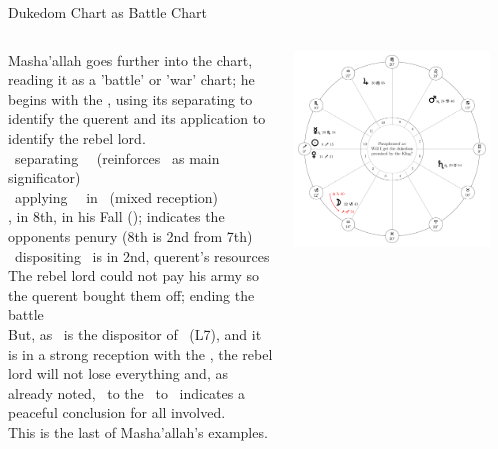 \begin{frame}[t]{Dukedom Chart as Battle Chart}
\footnotesize
\begin{columns}[T, onlytextwidth]
Masha'allah goes further into the chart, reading it as a 'battle' or 'war' chart; he begins with the \Moon, using its separating to identify the querent and its application to identify the rebel lord. \\
\vspace{0.25cm}
\Moon\ separating \Trine\ \Jupiter\ (reinforces \Jupiter\ as main significator) \\
\Moon\ applying \Opposition\ \Mars\ in \Cancer\ (mixed reception) \\
\vspace{0.2cm}
\Mars\Retrograde, in 8th, in his Fall (\Cancer); indicates the opponents penury (8th is 2nd from 7th) \\
\vspace{0.2cm}
\Moon\ dispositing \Mars\ is in 2nd, querent's resources \\
The rebel lord could not pay his army so the querent bought them off; ending the battle \\
\vspace{0.25cm}
But, as \Mars\ is the dispositor of \Mercury\ (L7), and it is in a strong reception with the \Moon, the rebel lord will not lose everything and, as already noted, \Mercury\ to the \Sextile\ to \Jupiter\ indicates a peaceful conclusion for all involved.\\
\vspace{0.2cm}
This is the last of Masha'allah's examples.
\begin{center}
{\includegraphics[width=0.9\textwidth]{charts/52a-chart-dukedom}} \\
\end{center}
\end{columns}
\end{frame}